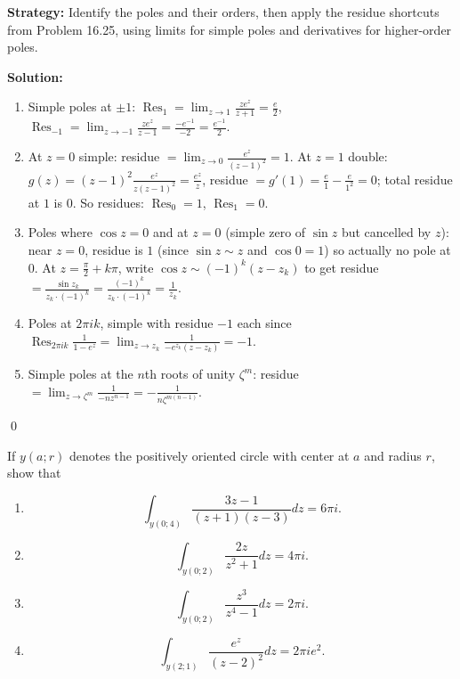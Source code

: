 \noindent\textbf{Strategy:} Identify the poles and their orders, then apply the residue shortcuts from Problem 16.25, using limits for simple poles and derivatives for higher-order poles.

\bigskip\noindent\textbf{Solution:}
\begin{enumerate}[label=(\alph*)]
\item Simple poles at $\pm1$: $\operatorname{Res}_{1}=\lim_{z\to1}\frac{ze^z}{z+1}=\tfrac{e}{2}$, $\operatorname{Res}_{-1}=\lim_{z\to-1}\frac{ze^z}{z-1}=\tfrac{-e^{-1}}{-2}=\tfrac{e^{-1}}{2}$.
\item At $z=0$ simple: residue $=\lim_{z\to0}\frac{e^z}{(z-1)^2}=1$. At $z=1$ double: $g(z)=(z-1)^2\frac{e^z}{z(z-1)^2}=\frac{e^z}{z}$, residue $=g'(1)=\frac{e}{1}-\frac{e}{1^2}=0$; total residue at $1$ is $0$. So residues: $\operatorname{Res}_0=1$, $\operatorname{Res}_1=0$.
\item Poles where $\cos z=0$ and at $z=0$ (simple zero of $\sin z$ but cancelled by $z$): near $z=0$, residue is $1$ (since $\sin z\sim z$ and $\cos 0=1$) so actually no pole at $0$. At $z=\frac{\pi}{2}+k\pi$, write $\cos z\sim (-1)^k(z-z_k)$ to get residue $=\frac{\sin z_k}{z_k\cdot(-1)^k}=\frac{(-1)^k}{z_k\cdot(-1)^k}=\frac{1}{z_k}$.
\item Poles at $2\pi i k$, simple with residue $-1$ each since $\operatorname{Res}_{2\pi i k}\frac{1}{1-e^z}=\lim_{z\to z_k}\frac{1}{-e^{z_k}(z-z_k)}=-1$.
\item Simple poles at the $n$th roots of unity $\zeta^m$: residue $=\lim_{z\to\zeta^m}\frac{1}{-n z^{n-1}}=-\frac{1}{n\zeta^{m(n-1)}}$.
\end{enumerate}\qed


\begin{problembox}
\begin{problemstatement}
If \( y(a; r) \) denotes the positively oriented circle with center at \( a \) and radius \( r \), show that
\begin{enumerate}[label=(\alph*)]
\item \[ \int_{y(0;4)} \frac{3z - 1}{(z + 1)(z - 3)} dz = 6\pi i. \]
\item \[ \int_{y(0;2)} \frac{2z}{z^2 + 1} dz = 4\pi i. \]
\item \[ \int_{y(0;2)} \frac{z^3}{z^4 - 1} dz = 2\pi i. \]
\item \[ \int_{y(2;1)} \frac{e^z}{(z - 2)^2} dz = 2\pi ie^2. \]
\end{enumerate}
\end{problemstatement}
\end{problembox}

